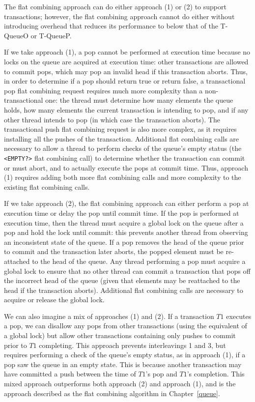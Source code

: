 The flat combining approach can do either approach (1) or (2) to support transactions; however, the flat combining approach cannot do either without introducing overhead that reduces its performance to below that of the T-QueueO or T-QueueP.

If we take approach (1), a pop cannot be performed at execution time because no locks on the queue are acquired at execution time: other transactions are allowed to commit pops, which may pop an invalid head if this transaction aborts. Thus, in order to determine if a pop should return true or return false, a transactional pop flat combining request requires much more complexity than a non-transactional one: the thread must determine how many elements the queue holds, how many elements the current transaction is intending to pop, and if any other thread intends to pop (in which case the transaction aborts). The transactional push flat combining request is also more complex, as it requires installing all the pushes of the transaction. Additional flat combining calls are necessary to allow a thread to perform checks of the queue's empty status (the \texttt{<EMPTY?>} flat combining call) to determine whether the transaction can commit or must abort, and to actually execute the pops at commit time. Thus, approach (1) requires adding both more flat combining calls and more complexity to the existing flat combining calls.

If we take approach (2), the flat combining approach can either perform a pop at execution time or delay the pop until commit time. If the pop is performed at execution time, then the thread must acquire a global lock on the queue after a pop and hold the lock until commit: this prevents another thread from observing an inconsistent state of the queue. If a pop removes the head of the queue prior to commit and the transaction later aborts, the popped element must be re-attached to the head of the queue. Any thread performing a pop must acquire a global lock to ensure that no other thread can commit a transaction that pops off the incorrect head of the queue (given that elements may be reattached to the head if the transaction aborts). Additional flat combining calls are necessary to acquire or release the global lock. 

We can also imagine a mix of approaches (1) and (2). If a transaction $T1$ executes a pop, we can disallow any pops from other transactions (using the equivalent of a global lock) but allow other transactions containing only pushes to commit prior to $T1$ completing. This approach prevents interleavings 1 and 3, but requires performing a check of the queue's empty status, as in approach (1), if a pop saw the queue in an empty state. This is because another transaction may have committed a push between the time of $T1$'s pop and $T1$'s completion. This mixed approach outperforms both approach (2) and approach (1), and is the approach described as the flat combining algorithm in Chapter~\ref{queue}. 

